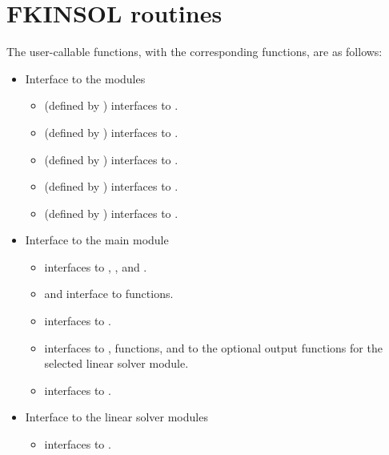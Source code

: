 \section{FKINSOL routines}\label{sss:fkinroutines}

The user-callable functions, with the corresponding {\kinsol} functions,
are as follows:
\begin{itemize}
\item
  Interface to the {\nvector} modules
  \begin{itemize}
  \item {} (defined by {\nvecs}) 
    interfaces to .
  \item {} (defined by {\nvecopenmp}) 
    interfaces to .
  \item {} (defined by {\nvecpthreads}) 
    interfaces to .
  \item {} (defined by {\nvecp}) 
    interfaces to .
  \item {} (defined by {\nvecph}) 
    interfaces to .
  \end{itemize}
\item Interface to the main {\kinsol} module
  \begin{itemize}
  \item {}
    interfaces to , , and .
  \item {} and 
    interface to  functions.
  \item {}
    interfaces to .
  \item {}
    interfaces to ,  functions, and to the optional
    output functions for the selected linear solver module.
  \item {}    
    interfaces to .
  \end{itemize}  
\item Interface to the linear solver modules
  \begin{itemize}
  \item {}
    interfaces to .

\end{itemize}
\end{itemize}
